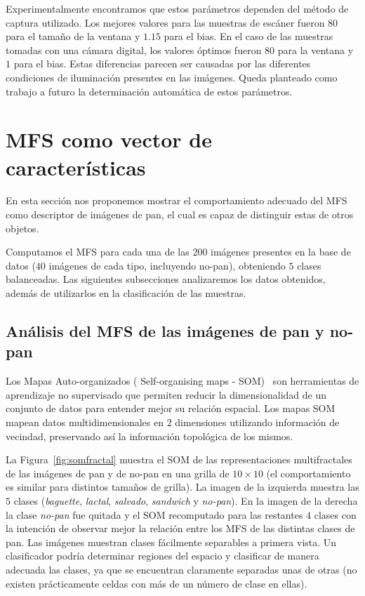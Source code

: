 \documentclass[spanish,a4paper,11pt,oneside,links]{report}
\begin{document}
Experimentalmente encontramos que estos parámetros dependen del método de captura utilizado. Los mejores valores para las muestras de escáner fueron $80$ para el tamaño de la ventana y $1.15 $ para el bias. En el caso de las muestras tomadas con una cámara digital, los valores óptimos fueron $80$ para la ventana y $1$ para el bias.  Estas diferencias parecen ser causadas por las diferentes condiciones de iluminación presentes en las imágenes. Queda planteado como trabajo a futuro la determinación automática de estos parámetros.

\section{MFS como vector de caracter\'isticas}

En esta sección nos proponemos mostrar el comportamiento adecuado del MFS como descriptor de imágenes de pan, el cual es capaz de distinguir estas de otros objetos.

Computamos el MFS para cada una de las $200$ imágenes presentes en la base de datos ($40$ imágenes de cada tipo, incluyendo no-pan), obteniendo $5$ clases balanceadas.  Las siguientes subsecciones analizaremos los datos obtenidos, además de utilizarlos en la clasificación de las muestras.

\subsection{Análisis del MFS de las imágenes de pan y no-pan}

Los Mapas Auto-organizados ( Self-organising maps -  SOM)~\cite{Kohonen2001} son herramientas de aprendizaje no supervisado que permiten reducir la dimensionalidad de un conjunto de datos para entender mejor su relación espacial. Los mapas SOM mapean datos multidimensionales en $2$ dimensiones utilizando información de vecindad, preservando así la información topológica de los mismos.

La Figura~\ref{fig:somfractal} muestra el  SOM de las representaciones multifractales de las imágenes de pan y de no-pan en una grilla de $10\times 10$ (el comportamiento es similar para distintos tamaños de grilla). La imagen de la izquierda muestra las $5$ clases ({\em baguette}, {\em lactal}, {\em salvado}, {\em sandwich} y {\em no-pan}). En la imagen de la derecha la clase {\em no-pan} fue quitada y el SOM recomputado para las restantes $4$ clases con la intención de observar mejor la relación entre los MFS de las distintas clases de pan. Las imágenes muestran clases fácilmente separables a primera vista. Un clasificador podría determinar regiones del espacio y clasificar de manera adecuada las clases, ya que se encuentran claramente separadas unas de otras (no existen prácticamente celdas con más de un número de clase en ellas).
\end{document}
